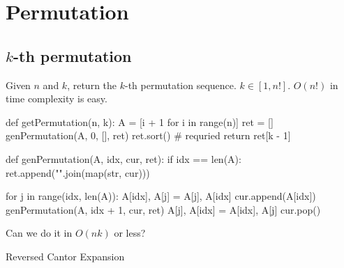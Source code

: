 \section{Permutation}

\subsection{$k$-th permutation}
Given $n$ and $k$, return the $k$-th permutation sequence. $k\in [1, n!]$. $O(n!)$ in time complexity is easy.
\begin{python}
def getPermutation(n, k):
    A = [i + 1 for i in range(n)]
    ret = []
    genPermutation(A, 0, [], ret)
    ret.sort()  # requried 
    return ret[k - 1]

def genPermutation(A, idx, cur, ret):
    if idx == len(A):
        ret.append("".join(map(str, cur)))

    for j in range(idx, len(A)):
        A[idx], A[j] = A[j], A[idx]
        cur.append(A[idx])
        genPermutation(A, idx + 1, cur, ret)
        A[j], A[idx] = A[idx], A[j]
        cur.pop()
\end{python}

Can we do it in $O(nk)$ or less?

Reversed Cantor Expansion

